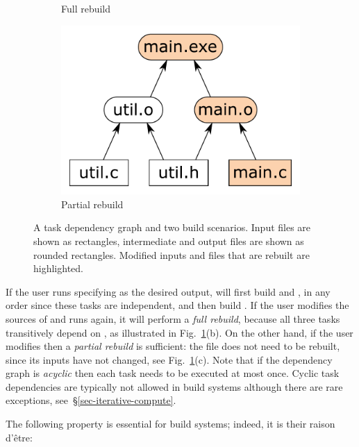 \begin{figure}[h]
\begin{subfigure}[b]{0.32\linewidth}
\caption{Full rebuild}
\end{subfigure}
\begin{subfigure}[b]{0.32\linewidth}
\centerline{\includegraphics[scale=0.28]{fig/make-example-partial.pdf}}
\caption{Partial rebuild}
\end{subfigure}
\vspace{-2mm}
\caption{A task dependency graph and two build scenarios. Input files are shown
as rectangles, intermediate and output files are shown as rounded rectangles.
Modified inputs and files that are rebuilt are highlighted.
\label{fig-make}}
\vspace{-2mm}
\end{figure}

If the user runs \Make specifying  as the desired output, \Make
will first build  and , in any order since these
tasks are independent, and then build . If the
user modifies the sources of  and runs \Make again, it will
perform a \emph{full rebuild}, because all three tasks transitively depend on
, as illustrated in Fig.~\ref{fig-make}(b). On the other hand, if
the user modifies  then a \emph{partial rebuild} is sufficient:
the file  does not need to be rebuilt, since its inputs have not
changed, see Fig.~\ref{fig-make}(c). Note that if the dependency graph is
\emph{acyclic} then each task needs to be executed at most once. Cyclic task
dependencies are typically not allowed in build systems although there are rare
exceptions, see~\S\ref{sec-iterative-compute}.

The following property is essential for build systems; indeed, it is their raison d'\^etre:

